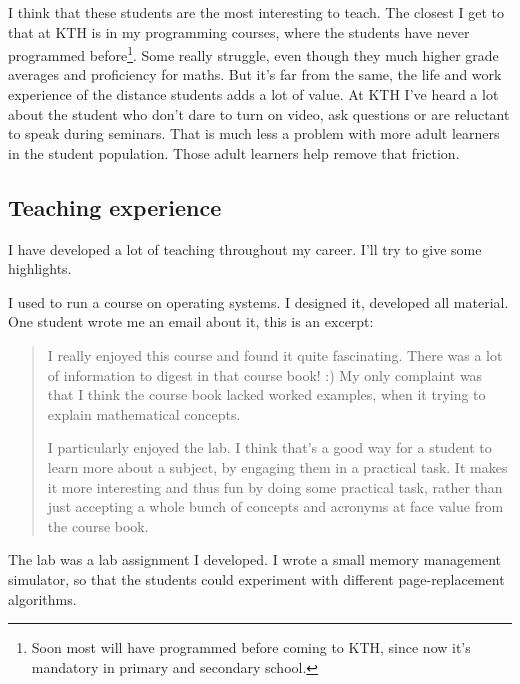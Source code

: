 I think that these students are the most interesting to teach.
The closest I get to that at KTH is in my programming courses, where the 
students have never programmed before\footnote{%
  Soon most will have programmed before coming to KTH, since now it's mandatory 
  in primary and secondary school.
}.
Some really struggle, even though they much higher grade averages and 
proficiency for maths.
But it's far from the same, the life and work experience of the distance 
students adds a lot of value.
At KTH I've heard a lot about the student who don't dare to turn on video, ask 
questions or are reluctant to speak during seminars.
That is much less a problem with more adult learners in the student population.
Those adult learners help remove that friction.

\subsection{Teaching experience}


I have developed a lot of teaching throughout my career.
I'll try to give some highlights.

I used to run a course on operating systems.
I designed it, developed all material.
One student wrote me an email about it, this is an excerpt:
\begin{quote}
  I really enjoyed this course and found it quite fascinating. There was a lot 
  of information to digest in that course book! :) My only complaint was that I 
  think the course book lacked worked examples, when it trying to explain 
  mathematical concepts.

  I particularly enjoyed the lab. I think that's a good way for a student to 
  learn more about a subject, by engaging them in a practical task. It makes it 
  more interesting and thus fun by doing some practical task, rather than just 
  accepting a whole bunch of concepts and acronyms at face value from the 
  course book.
\end{quote}
The lab was a lab assignment I developed.
I wrote a small memory management simulator, so that the students could 
experiment with different page-replacement algorithms.

